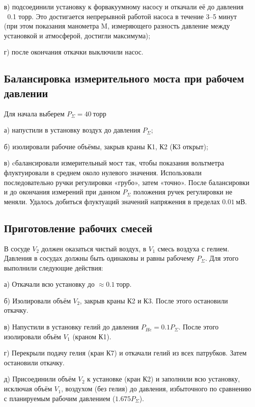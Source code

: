 \documentclass[a4paper, 12pt]{article}
\begin{document}
        в) подсоединили установку к форвакуумному насосу и откачали её до давления
        ~0.1 торр. Это достигается непрерывной работой насоса в течение
        3–5 минут (при этом показания манометра M, измеряющего разность
        давление между установкой и атмосферой, достигли максимума);

        г) после окончания откачки выключили насос.

    \subsection{Балансировка измерительного моста при рабочем давлении}

        Для начала выберем $P_{\Sigma} = 40~торр$

        а) напустили в установку воздух до давления $P_{\Sigma}$;

        б) изолировали рабочие объёмы, закрыв краны К1, К2 (К3 открыт);

        в) cбалансировали измерительный мост так, чтобы показания вольтметра флуктуировали в среднем около нулевого значения. Использовали последовательно ручки регулировки «грубо», затем «точно». После балансировки и до окончания измерений при данном $P_{\Sigma}$ положения ручек регулировки не меняли. Удалось добиться флуктуаций значений напряжения в пределах $0.01~мВ$.

    \subsection{Приготовление рабочих смесей}

        В сосуде $V_2$ должен оказаться чистый воздух, в $V_1$ смесь воздуха с гелием. Давления в сосудах должны быть одинаковы и равны рабочему $P_{\Sigma}$. Для этого выполнили следующие действия:

        а) Откачали всю установку до $\approx 0.1~торр$.

        б) Изолировали объём $V_2$, закрыв краны К2 и К3. После этого остановили откачку.

        в) Напустили в установку гелий до давления $P_{He} = 0.1P_{\Sigma}$. После этого изолировали объём $V_1$ (краном К1).

        г) Перекрыли подачу гелия (кран К7) и откачали гелий из всех патрубков. Затем остановили откачку.

        д) Присоединили объём $V_2$ к установке (кран К2) и заполнили всю установку, исключая объём $V_1$, воздухом (без гелия) до давления, избыточного по сравнению с планируемым рабочим давлением ($1.675P_{\Sigma}$).
\end{document}
